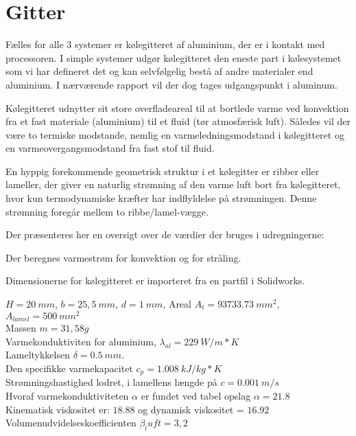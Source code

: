 \section{Gitter}

Fælles for alle 3 systemer er kølegitteret af aluminium, der er i kontakt med processoren. 
I simple systemer udgør kølegitteret den eneste part i kølesystemet som vi har defineret det og kan selvfølgelig bestå af andre materialer end aluminium. I nærværende rapport vil der dog tages udgangspunkt i aluminum.

Kølegitteret udnytter sit store overfladeareal til at bortlede varme ved konvektion fra et fast materiale (aluminium) til et fluid (tør atmosfærisk luft).
Således vil der være to termiske modstande, nemlig en varmeledningsmodstand i kølegitteret og en varmeovergangsmodstand fra fast stof til fluid.

En hyppig forekommende geometrisk struktur i et kølegitter er ribber eller lameller, der giver en naturlig strømning af den varme luft bort fra kølegitteret, hvor kun termodynamiske kræfter har indflyldelse på strømningen. Denne strømning foregår mellem to ribbe/lamel-vægge. 

Der præsenteres her en oversigt over de værdier der bruges i udregningerne: 

Der beregnes varmestrøm for konvektion og for stråling.

Dimensionerne for kølegitteret er importeret fra en partfil i Solidworks. %

$H = 20\ mm$, $b = 25,5\ mm$, $d = 1\ mm$, Areal $A_t = 93733.73\ mm^2$, $A_{lamel}= 500\ mm^2$  \\ 
Massen $m = 31,58 g$ \\
Varmekonduktiviten for aluminium, $\lambda_{al} = 229\ W/m*K$ \\  
Lameltykkelsen $\delta = 0.5\ mm.$  \\
Den specifikke varmekapacitet $c_{p} = 1.008\ kJ/kg*K$ \\
Strømningshastighed lodret, i lamellens længde på $c = 0.001\ m/s$ \\


Hvoraf varmekonduktiviteten $\alpha$ er fundet ved tabel opslag $\alpha = 21.8$ \\
Kinematisk viskositet er: $18.88$ og dynamisk viskositet = $16.92$  \\
Volumenudvidelseskoefficienten $\beta_luft = 3,2$ \\
 
